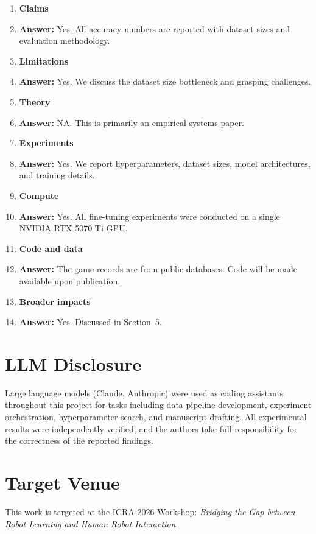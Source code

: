 \documentclass{article}
\begin{document}
\begin{enumerate}

\item {\bf Claims}
\item[] \textbf{Answer:} Yes. All accuracy numbers are reported with dataset sizes and evaluation methodology.

\item {\bf Limitations}
\item[] \textbf{Answer:} Yes. We discuss the dataset size bottleneck and grasping challenges.

\item {\bf Theory}
\item[] \textbf{Answer:} NA. This is primarily an empirical systems paper.

\item {\bf Experiments}
\item[] \textbf{Answer:} Yes. We report hyperparameters, dataset sizes, model architectures, and training details.

\item {\bf Compute}
\item[] \textbf{Answer:} Yes. All fine-tuning experiments were conducted on a single NVIDIA RTX 5070 Ti GPU.

\item {\bf Code and data}
\item[] \textbf{Answer:} The game records are from public databases. Code will be made available upon publication.

\item {\bf Broader impacts}
\item[] \textbf{Answer:} Yes. Discussed in Section~5.

\end{enumerate}

\section*{LLM Disclosure}

Large language models (Claude, Anthropic) were used as coding assistants throughout this project for tasks including data pipeline development, experiment orchestration, hyperparameter search, and manuscript drafting. All experimental results were independently verified, and the authors take full responsibility for the correctness of the reported findings.

\section*{Target Venue}

This work is targeted at the ICRA 2026 Workshop: \textit{Bridging the Gap between Robot Learning and Human-Robot Interaction}.
\end{document}
